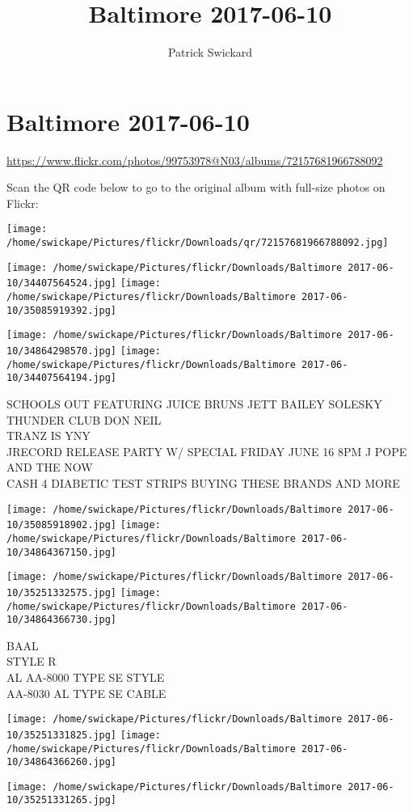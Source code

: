 \documentclass[10pt,letterpaper]{article}
\title{Baltimore 2017-06-10}
\author{Patrick Swickard}
\date{}
\begin{document}
\section*{Baltimore 2017-06-10}

\url{https://www.flickr.com/photos/99753978@N03/albums/72157681966788092}

Scan the QR code below to go to the original album with full-size photos on Flickr:

\texttt{[image: /home/swickape/Pictures/flickr/Downloads/qr/72157681966788092.jpg]}
\pagebreak

\texttt{[image: /home/swickape/Pictures/flickr/Downloads/Baltimore 2017-06-10/34407564524.jpg]}
\texttt{[image: /home/swickape/Pictures/flickr/Downloads/Baltimore 2017-06-10/35085919392.jpg]}

\texttt{[image: /home/swickape/Pictures/flickr/Downloads/Baltimore 2017-06-10/34864298570.jpg]}
\texttt{[image: /home/swickape/Pictures/flickr/Downloads/Baltimore 2017-06-10/34407564194.jpg]}

SCHOOLS OUT FEATURING JUICE BRUNS JETT BAILEY SOLESKY THUNDER CLUB DON NEIL\\
TRANZ IS YNY\\
JRECORD RELEASE PARTY W/ SPECIAL FRIDAY JUNE 16 8PM J POPE AND THE NOW\\
CASH 4 DIABETIC TEST STRIPS BUYING THESE BRANDS AND MORE
\pagebreak

\texttt{[image: /home/swickape/Pictures/flickr/Downloads/Baltimore 2017-06-10/35085918902.jpg]}
\texttt{[image: /home/swickape/Pictures/flickr/Downloads/Baltimore 2017-06-10/34864367150.jpg]}

\texttt{[image: /home/swickape/Pictures/flickr/Downloads/Baltimore 2017-06-10/35251332575.jpg]}
\texttt{[image: /home/swickape/Pictures/flickr/Downloads/Baltimore 2017-06-10/34864366730.jpg]}

BAAL\\
STYLE R\\
AL AA{-}8000 TYPE SE STYLE\\
AA{-}8030 AL TYPE SE CABLE
\pagebreak

\texttt{[image: /home/swickape/Pictures/flickr/Downloads/Baltimore 2017-06-10/35251331825.jpg]}
\texttt{[image: /home/swickape/Pictures/flickr/Downloads/Baltimore 2017-06-10/34864366260.jpg]}

\vspace{0.25in}
\texttt{[image: /home/swickape/Pictures/flickr/Downloads/Baltimore 2017-06-10/35251331265.jpg]}
\end{document}
